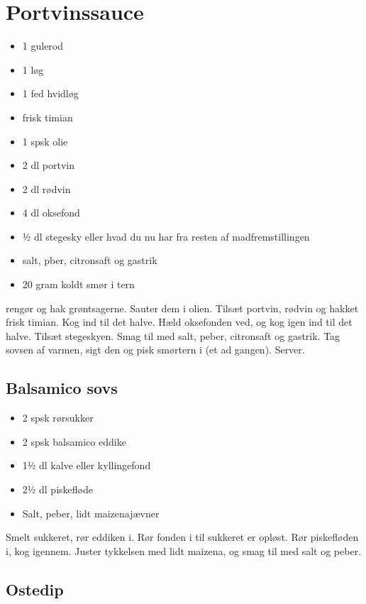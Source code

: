 \documentclass[
  letterpaper,
  DIV=11,
  numbers=noendperiod]{scrreprt}
\providecommand{\tightlist}{%
  \setlength{\itemsep}{0pt}\setlength{\parskip}{0pt}}\usepackage{longtable,booktabs,array}
\begin{document}
\hypertarget{portvinssauce}{%
\section{Portvinssauce}\label{portvinssauce}}

\begin{itemize}
\tightlist
\item
  1 gulerod
\item
  1 løg
\item
  1 fed hvidløg
\item
  frisk timian
\item
  1 spsk olie
\item
  2 dl portvin
\item
  2 dl rødvin
\item
  4 dl oksefond
\item
  ½ dl stegesky eller hvad du nu har fra resten af madfremstillingen
\item
  salt, pber, citronsaft og gastrik
\item
  20 gram koldt smør i tern
\end{itemize}

rengør og hak grøntsagerne. Sauter dem i olien. Tilsæt portvin, rødvin
og hakket frisk timian. Kog ind til det halve. Hæld oksefonden ved, og
kog igen ind til det halve. Tilsæt stegeskyen. Smag til med salt, peber,
citronsaft og gastrik. Tag sovsen af varmen, sigt den og pisk smørtern i
(et ad gangen). Server.

\hypertarget{balsamico-sovs}{%
\subsection{Balsamico sovs}\label{balsamico-sovs}}

\begin{itemize}
\tightlist
\item
  2 spsk rørsukker
\item
  2 spsk balsamico eddike
\item
  1½ dl kalve eller kyllingefond
\item
  2½ dl piskefløde
\item
  Salt, peber, lidt maizenajævner
\end{itemize}

Smelt sukkeret, rør eddiken i. Rør fonden i til sukkeret er opløst. Rør
piskefløden i, kog igennem. Juster tykkelsen med lidt maizena, og smag
til med salt og peber.

\hypertarget{ostedip}{%
\subsection{Ostedip}\label{ostedip}}
\end{document}
